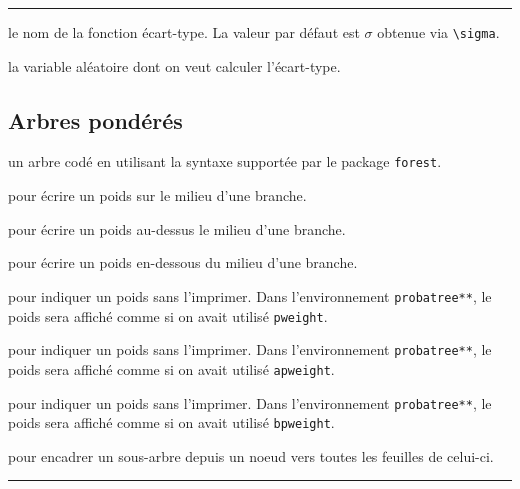 \documentclass[12pt,a4paper]{article}
\newcommand\env[1]{\texttt{#1}}
\theoremstyle{definition}
\newcommand\separation{
	\medskip
	\hfill\rule{0.5\textwidth}{0.75pt}\hfill
	\medskip
}
\newcommand\extraspace{
	\vspace{0.25em}
}
\begin{document}
\separation



\IDoption{} le nom de la fonction écart-type. La valeur par défaut est $\sigma$ obtenue via \verb#\sigma#.

\IDarg{} la variable aléatoire dont on veut calculer l'écart-type.




















\subsection{Arbres pondérés}






\Content{} un arbre codé en utilisant la syntaxe supportée par le package \verb#forest#.

\extraspace

  pour écrire un poids sur le milieu d'une branche.

 pour écrire un poids au-dessus le milieu d'une branche.

 pour écrire un poids en-dessous du milieu d'une branche.

\extraspace

 pour indiquer un poids sans l'imprimer.
Dans l'environnement \env{probatree**}, le poids sera affiché comme si on avait utilisé \verb#pweight#.

 pour indiquer un poids sans l'imprimer.
Dans l'environnement \env{probatree**}, le poids sera affiché comme si on avait utilisé \verb#apweight#.

 pour indiquer un poids sans l'imprimer.
Dans l'environnement \env{probatree**}, le poids sera affiché comme si on avait utilisé \verb#bpweight#.

\extraspace

 pour encadrer un sous-arbre depuis un noeud vers toutes les feuilles de celui-ci.


\separation
\end{document}
